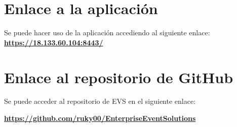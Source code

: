 \section{Enlace a la aplicación}
Se puede hacer uso de la aplicación accediendo al siguiente enlace: \textbf{\href{https://18.133.60.104:8443/}{https://18.133.60.104:8443/}}
\section{Enlace al repositorio de GitHub}
Se puede acceder al repositorio de EVS en el siguiente enlace: 

\textbf{\href{https://github.com/ruky00/EnterpriseEventSolutions}{https://github.com/ruky00/EnterpriseEventSolutions}}

